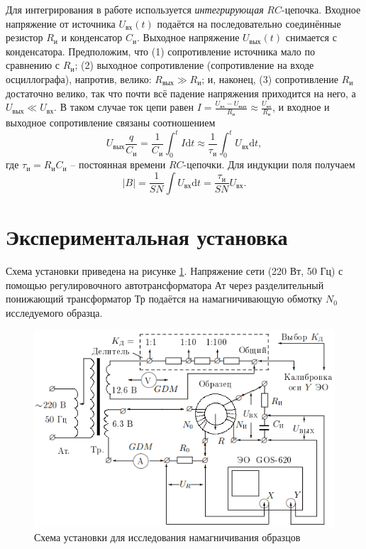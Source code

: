 \documentclass[a4paper,10pt]{article}
\begin{document}
Для интегрирования в работе используется \textit{интегрирующая} $RC$-цепочка. Входное напряжение от источника $U_{\text{вх}}(t)$ подаётся на последовательно соединённые резистор $R_{\text{и}}$ и конденсатор $C_{\text{и}}$. Выходное напряжение $U_{\text{вых}}(t)$ снимается с конденсатора. Предположим, что (1) сопротивление источника мало по сравнению с $R_{\text{и}}$; (2) выходное сопротивление (сопротивление на входе осциллографа), напротив, велико: $R_{\text{вых}}\gg R_{\text{и}}$; и, наконец, (3) сопротивление $R_{\text{и}}$ достаточно велико, так что почти всё падение напряжения приходится на него, а $U_{\text{вых}}\ll U_{\text{вх}}$. В таком случае ток цепи равен $I=\frac{U_{\text{вх}}-U_{\text{вых}}}{R_{\text{и}}}\approx\frac{U_{\text{вх}}}{R_{\text{и}}}$, и входное и выходное сопротивление связаны соотношением\[U_{\text{вых}}\frac{q}{C_{\text{и}}}=\frac{1}{C_{\text{и}}}\int_0^tI\text{d}t\approx\frac{1}{\tau_{\text{и}}}\int_0^tU_{\text{вх}}\text{d}t,\]где $\tau_{\text{и}}=R_{\text{и}}C_{\text{и}}$ -- постоянная времени $RC$-цепочки. Для индукции поля получаем\[\left|B\right|=\frac{1}{SN}\int U_{\text{вх}}\text{d}t=\frac{\tau_{\text{и}}}{SN}U_{\text{вх}}.\]



\section*{Экспериментальная установка}

Схема установки приведена на рисунке \ref{Device}. Напряжение сети (220 Вт, 50 Гц) с помощью регулировочного автотрансформатора Ат через разделительный понижающий трансформатор Тр подаётся на намагничивающую обмотку $N_0$ исследуемого образца.

\begin{figure}[h!]
	\centering
	\includegraphics[scale=0.8]{lab345ris2.png}
	\caption{Схема установки для исследования намагничивания образцов} \label{Device}
\end{figure}
\end{document}
